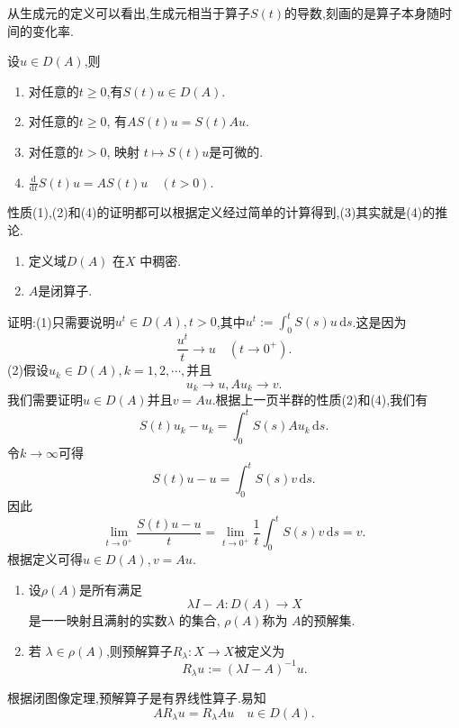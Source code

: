   从生成元的定义可以看出,生成元相当于算子$S(t)$的导数,刻画的是算子本身随时间的变化率. 
  \begin{theorem}
    设$u\in D(A)$,则
    \begin{enumerate}
      \item 对任意的$t\ge 0$,有$S(t)u \in D(A)$.
      \item 对任意的$t\ge 0$, 有$AS(t)u=S(t)Au$.
      \item 对任意的$t>0$, 映射 $t\mapsto S(t)u$是可微的.
      \item  $\frac{\mathrm{d}}{\mathrm{d}t}S(t)u=AS(t)u \quad (t>0)$.
    \end{enumerate}
  \end{theorem}
  性质(1),(2)和(4)的证明都可以根据定义经过简单的计算得到,(3)其实就是(4)的推论.
  \begin{theorem}
    \begin{enumerate}
      \item 定义域$D(A)$ 在$X$ 中稠密.
      \item $A$是闭算子.
    \end{enumerate}
  \end{theorem}
  证明:(1)只需要说明$u^{t}\in D(A),t>0$,其中$u^{t}:=\int_0^{t}S(s)u\,\mathrm{d}s$.这是因为
  \[
    \frac{u^{t}}{t}\to u\quad(t\to 0^{+}).
  \] 
  (2)假设$u_k \in D(A),k=1,2,\cdots,$并且
  \begin{equation}
    u_k\to u,Au_k\to v.
  \end{equation}
  我们需要证明$u\in D(A)$并且$v=Au$.根据上一页半群的性质(2)和(4),我们有
   \[
     S(t)u_k-u_k=\int_0^{t}S(s)Au_k\,\mathrm{d}s.
  \] 
  令$k\to \infty$可得
  \[
    S(t)u-u=\int_0^{t}S(s)v\,\mathrm{d}s.
  \] 
  因此
  \[
    \lim_{t\to 0^{+}}\frac{S(t)u-u}{t}=\lim_{t\to 0^{+}}\frac{1}{t}\int_0^{t}S(s)v\,\mathrm{d}s=v.
  \]
  根据定义可得$u\in D(A),v=Au$.

  \begin{definition}
    \begin{enumerate}
      \item 设$\rho(A)$是所有满足
	 \[
	   \lambda I-A:D(A)\to X
	\] 
	是一一映射且满射的实数$\lambda$ 的集合, $\rho(A)$称为 $A$的预解集.
      \item 若 $\lambda \in \rho(A)$,则预解算子$R_\lambda:X\to X$被定义为
	\[
	  R_\lambda u:=(\lambda I-A)^{-1}u.
	\] 
    \end{enumerate}
  \end{definition}
  根据闭图像定理,预解算子是有界线性算子.易知
  \[
    AR_\lambda u= R_\lambda A u\quad u \in D(A).
  \] 


